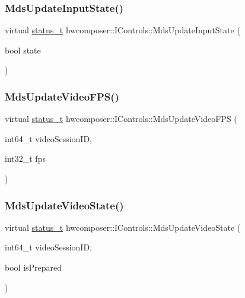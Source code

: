 \subsubsection{\texorpdfstring{Mds\+Update\+Input\+State()}{MdsUpdateInputState()}}
{\footnotesize\ttfamily virtual \mbox{\hyperlink{hwcserviceapi_8h_a3806fb2027d9a316d8ca8d9b8b8eb96f}{status\+\_\+t}} hwcomposer\+::\+I\+Controls\+::\+Mds\+Update\+Input\+State (\begin{DoxyParamCaption}\item[{bool}]{state }\end{DoxyParamCaption})\hspace{0.3cm}{\ttfamily [pure virtual]}}

\mbox{\label{classhwcomposer_1_1IControls_a15c005a5a1c9c0a5a30ffebefdfb6b6f}} 
\subsubsection{\texorpdfstring{Mds\+Update\+Video\+F\+P\+S()}{MdsUpdateVideoFPS()}}
{\footnotesize\ttfamily virtual \mbox{\hyperlink{hwcserviceapi_8h_a3806fb2027d9a316d8ca8d9b8b8eb96f}{status\+\_\+t}} hwcomposer\+::\+I\+Controls\+::\+Mds\+Update\+Video\+F\+PS (\begin{DoxyParamCaption}\item[{int64\+\_\+t}]{video\+Session\+ID,  }\item[{int32\+\_\+t}]{fps }\end{DoxyParamCaption})\hspace{0.3cm}{\ttfamily [pure virtual]}}

\mbox{\label{classhwcomposer_1_1IControls_ad2d374da82a11a7a6b2bade97dc87955}} 
\subsubsection{\texorpdfstring{Mds\+Update\+Video\+State()}{MdsUpdateVideoState()}}
{\footnotesize\ttfamily virtual \mbox{\hyperlink{hwcserviceapi_8h_a3806fb2027d9a316d8ca8d9b8b8eb96f}{status\+\_\+t}} hwcomposer\+::\+I\+Controls\+::\+Mds\+Update\+Video\+State (\begin{DoxyParamCaption}\item[{int64\+\_\+t}]{video\+Session\+ID,  }\item[{bool}]{is\+Prepared }\end{DoxyParamCaption})\hspace{0.3cm}{\ttfamily [pure virtual]}}

